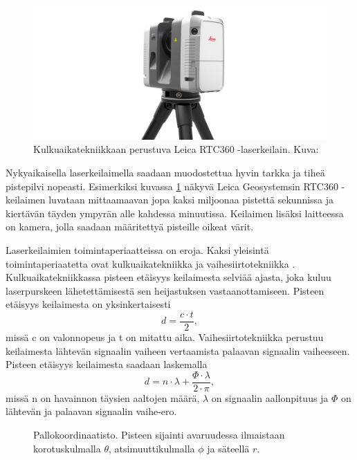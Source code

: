 \begin{figure}
    \centering
    \includegraphics[width=0.7\paperwidth]{img/leica.jpg}
    \caption{Kulkuaikatekniikkaan perustuva Leica RTC360 -laserkeilain. Kuva: \cite{skannerikuva}}
    \label{leica}
\end{figure}

Nykyaikaisella laserkeilaimella saadaan muodostettua hyvin tarkka ja tiheä pistepilvi nopeasti. Esimerkiksi kuvassa \ref{leica} näkyvä Leica Geosystemsin RTC360 -keilaimen luvataan mittaamaavan jopa kaksi miljoonaa pistettä sekunnissa ja kiertävän täyden ympyrän alle kahdessa minuutissa. Keilaimen lisäksi laitteessa on kamera, jolla saadaan määritettyä pisteille oikeat värit. \cite{leica} 

Laserkeilaimien toimintaperiaatteissa on eroja. Kaksi yleisintä toimintaperiaatetta ovat kulkuaikatekniikka  ja vaihesiirtotekniikka . Kulkuaikatekniikkassa pisteen etäisyys keilaimesta selviää ajasta, joka kuluu laserpurskeen lähetettämisestä sen heijastuksen vastaanottamiseen. Pisteen etäisyys keilaimesta on yksinkertaisesti 
\begin{equation}
    d=\frac{c\cdot t}{2},    
\end{equation}
missä c on valonnopeus ja t on mitattu aika. \cite{fabritius}   
Vaihesiirtotekniikka perustuu keilaimesta lähtevän signaalin vaiheen vertaamista palaavan signaalin vaiheeseen. Pisteen etäisyys keilaimesta saadaan laskemalla 
\begin{equation}
    d=n\cdot \lambda + \frac{\Phi \cdot \lambda}{2 \cdot \pi},
\end{equation}
missä n on havainnon täysien aaltojen määrä, $\lambda$ on signaalin aallonpituus ja $\Phi$ on lähtevän ja palaavan signaalin vaihe-ero. \cite{fabritius}

\begin{figure}
    \centering
    
    \caption{Pallokoordinaatisto. Pisteen sijainti avaruudessa ilmaistaan korotuskulmalla $\theta$, atsimuuttikulmalla $\phi$ ja säteellä $r$.}
    \label{pallo}
\end{figure}{}

